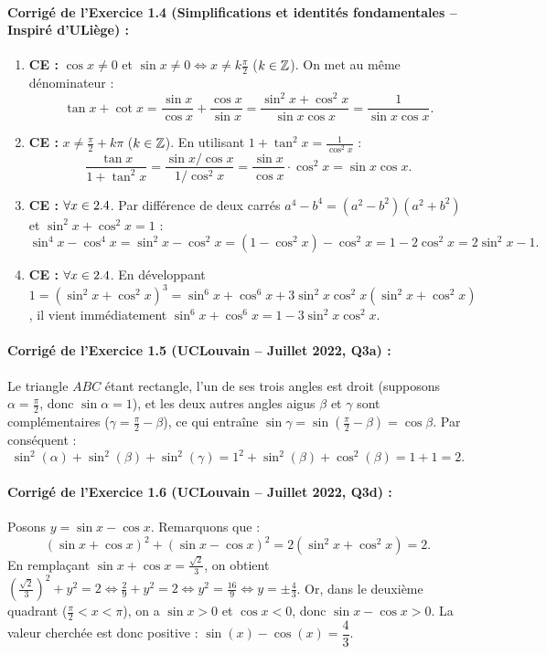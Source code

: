 \paragraph{Corrigé de l'Exercice 1.4 (Simplifications et identités fondamentales -- Inspiré d'ULiège) :}
\begin{enumerate}[label=(\alph*)]
    \item \textbf{CE :} $\cos x \neq 0$ et $\sin x \neq 0 \iff x \neq k\frac{\pi}{2}$ ($k\in\mathbb{Z}$). On met au même dénominateur :
    \[
        \tan x + \cot x = \frac{\sin x}{\cos x} + \frac{\cos x}{\sin x} = \frac{\sin^2 x + \cos^2 x}{\sin x \cos x} = \frac{1}{\sin x \cos x}.
    \]
    \item \textbf{CE :} $x \neq \frac{\pi}{2} + k\pi$ ($k\in\mathbb{Z}$). En utilisant $1 + \tan^2 x = \frac{1}{\cos^2 x}$ :
    \[
        \frac{\tan x}{1 + \tan^2 x} = \frac{\sin x / \cos x}{1 / \cos^2 x} = \frac{\sin x}{\cos x} \cdot \cos^2 x = \sin x \cos x.
    \]
    \item \textbf{CE :} $\forall x \in 2.4$. Par différence de deux carrés $a^4 - b^4 = (a^2-b^2)(a^2+b^2)$ et $\sin^2 x + \cos^2 x = 1$ :
    \[
        \sin^4 x - \cos^4 x = \sin^2 x - \cos^2 x = (1 - \cos^2 x) - \cos^2 x = 1 - 2\cos^2 x = 2\sin^2 x - 1.
    \]
    \item \textbf{CE :} $\forall x \in 2.4$. En développant $1 = (\sin^2 x + \cos^2 x)^3 = \sin^6 x + \cos^6 x + 3\sin^2 x\cos^2 x(\sin^2 x + \cos^2 x)$, il vient immédiatement $\sin^6 x + \cos^6 x = 1 - 3\sin^2 x\cos^2 x$.
\end{enumerate}

\paragraph{Corrigé de l'Exercice 1.5 (UCLouvain -- Juillet 2022, Q3a) :}
Le triangle $ABC$ étant rectangle, l'un de ses trois angles est droit (supposons $\alpha = \frac{\pi}{2}$, donc $\sin\alpha = 1$), et les deux autres angles aigus $\beta$ et $\gamma$ sont complémentaires ($\gamma = \frac{\pi}{2} - \beta$), ce qui entraîne $\sin\gamma = \sin\left(\frac{\pi}{2}-\beta\right) = \cos\beta$. Par conséquent :
\[
    \sin^2(\alpha) + \sin^2(\beta) + \sin^2(\gamma) = 1^2 + \sin^2(\beta) + \cos^2(\beta) = 1 + 1 = \boxed{2}.
\]

\paragraph{Corrigé de l'Exercice 1.6 (UCLouvain -- Juillet 2022, Q3d) :}
Posons $y = \sin x - \cos x$. Remarquons que :
\[
    (\sin x + \cos x)^2 + (\sin x - \cos x)^2 = 2(\sin^2 x + \cos^2 x) = 2.
\]
En remplaçant $\sin x + \cos x = \frac{\sqrt{2}}{3}$, on obtient $\left(\frac{\sqrt{2}}{3}\right)^2 + y^2 = 2 \iff \frac{2}{9} + y^2 = 2 \iff y^2 = \frac{16}{9} \iff y = \pm\frac{4}{3}$.
Or, dans le deuxième quadrant ($\frac{\pi}{2} < x < \pi$), on a $\sin x > 0$ et $\cos x < 0$, donc $\sin x - \cos x > 0$. La valeur cherchée est donc positive : $\sin(x) - \cos(x) = \boxed{\dfrac{4}{3}}$.

